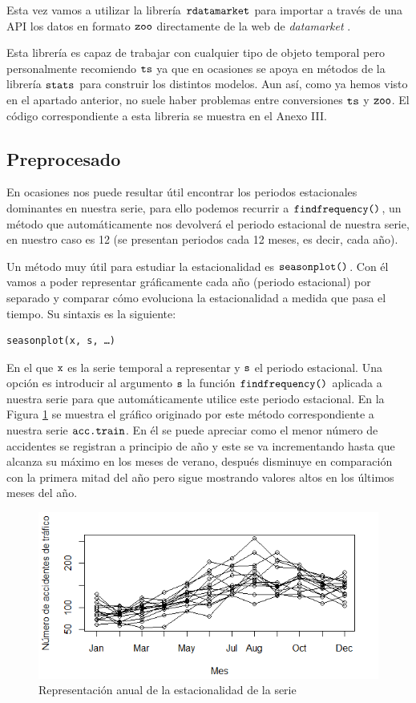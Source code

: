 Esta vez vamos a utilizar la librería $\verb!rdatamarket!$ para importar a través de una API los datos en formato $\verb!zoo!$ directamente de la web de \textit{datamarket} \cite{datamarket}.

Esta librería es capaz de trabajar con cualquier tipo de objeto temporal pero personalmente recomiendo $\verb!ts!$ ya que en ocasiones se apoya en métodos de la librería $\verb!stats!$ para construir los distintos modelos. Aun así, como ya hemos visto en el apartado anterior, no suele haber problemas entre conversiones $\verb!ts!$ y $\verb!zoo!$. El código correspondiente a esta libreria se muestra en el Anexo III.

\subsection{Preprocesado}
En ocasiones nos puede resultar útil encontrar los periodos estacionales dominantes en nuestra serie, para ello podemos recurrir a $\verb!findfrequency()!$, un método que automáticamente nos devolverá el periodo estacional de nuestra serie, en nuestro caso es 12 (se presentan periodos cada 12 meses, es decir, cada año).

Un método muy útil para estudiar la estacionalidad es $\verb!seasonplot()!$. Con él vamos a poder representar gráficamente cada año (periodo estacional) por separado y comparar cómo evoluciona la estacionalidad a medida que pasa el tiempo. Su sintaxis es la siguiente:
\begin{Verbatim}[fontsize=\footnotesize]
seasonplot(x, s, …)
\end{Verbatim}

En el que $\verb!x!$ es la serie temporal a representar y $\verb!s!$ el periodo estacional. Una opción es introducir al argumento $\verb!s!$ la función $\verb!findfrequency()!$ aplicada a nuestra serie para que automáticamente utilice este periodo estacional. En la Figura \ref{season} se muestra el gráfico originado por este método correspondiente a nuestra serie $\verb!acc.train!$. En él se puede apreciar como el menor número de accidentes se registran a principio de año y este se va incrementando hasta que alcanza su máximo en los meses de verano, después disminuye en comparación con la primera mitad del año pero sigue mostrando valores altos en los últimos meses del año.
\begin{figure}
    \centering
    \centerline{\includegraphics[scale = 0.7]{Images/Modelizacion/32.png}}
    \caption{Representación anual de la estacionalidad de la serie}
    \label{season}
\end{figure}

